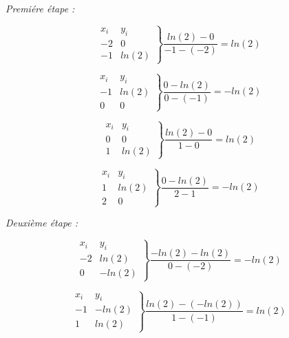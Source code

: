 \documentclass[12pt, letterpaper]{article}
\begin{document}
\begin{enumerate}
  \textit{Premiére étape :}

  \begin{equation*}
    \left.
    \begin{array}{ll}
      x_i & y_i \\
      -2 & 0 \\
      -1 & ln(2)
    \end{array}
    \right\}
    \frac{ln(2) - 0}{-1 - (-2)} = ln(2)
  \end{equation*}

  \begin{equation*}
    \left.
    \begin{array}{ll}
      x_i & y_i \\
      -1 & ln(2) \\
      0 & 0
    \end{array}
    \right\}
    \frac{0 - ln(2)}{0 - (-1)} = - ln(2)
  \end{equation*}

  \begin{equation*}
    \left.
    \begin{array}{ll}
      x_i & y_i \\
      0 & 0 \\
      1 & ln(2)
    \end{array}
    \right\}
    \frac{ln(2) - 0}{1 - 0} = ln(2)
  \end{equation*}

  \begin{equation*}
    \left.
    \begin{array}{ll}
      x_i & y_i \\
      1 & ln(2) \\
      2 & 0
    \end{array}
    \right\}
    \frac{0 - ln(2)}{2 - 1} = - ln(2)
  \end{equation*}

  \textit{Deuxième étape :}

  \begin{equation*}
    \left.
    \begin{array}{ll}
      x_i & y_i \\
      -2 & ln(2) \\
      0 & - ln(2)
    \end{array}
    \right\}
    \frac{- ln(2) - ln(2)}{0 - (-2)} = - ln(2)
  \end{equation*}
  
  \begin{equation*}
    \left.
    \begin{array}{ll}
      x_i & y_i \\
      -1 & - ln(2) \\
      1 & ln(2)
    \end{array}
    \right\}
    \frac{ln(2) - (-ln(2))}{1 - (-1)} = ln(2)
  \end{equation*}


\end{enumerate}
\end{document}
